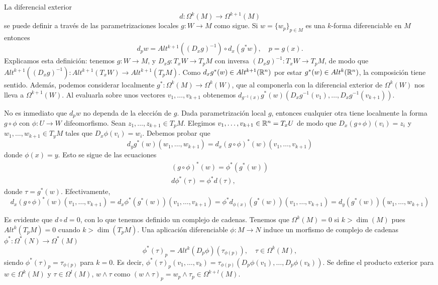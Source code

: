 \documentclass[CV.tex]{subfiles}
\begin{document}
La diferencial exterior
\[
d:\Omega^k(M)\to\Omega^{k+1}(M)
\]
se puede definir a través de las parametrizaciones locales $g:W\to M$ como sigue. Si $w=\{w_p\}_{p\in M}$ es una $k$-forma diferenciable en $M$ entonces
\[
d_pw=Alt^{k+1}((D_xg)^{-1})\circ d_x(g^*w),\quad p=g(x).
\]
Explicamos esta definición: tenemos $g:W\to M$, y $D_xg:T_xW\to T_pM$ con inversa $(D_xg)^{-1}:T_xW\to T_pM$, de modo que $Alt^{k+1}((D_xg)^{-1}):Alt^{k+1}(T_xW)\to Alt^{k+1}(T_pM)$. Como $d_xg^*(w)\in Alt^{k+1}(\mathbb{R}^n)$ por estar $g^*(w)\in Alt^{k}(\mathbb{R}^n)$, la composición tiene sentido. Además, podemos considerar localmente $g^*:\Omega^k(M)\to \Omega^k(W)$, que al componerla con la diferencial exterior de $\Omega^k(W)$ nos lleva a $\Omega^{k+1}(W)$. Al evaluarla sobre unos vectores $v_1,\dots, v_{k+1}$ obtenemos $d_{g^{-1}(x)}g^*(w)(D_xg^{-1}(v_1),\dots, D_xg^{-1}(v_{k+1}))$. 

No es inmediato que $d_pw$ no dependa de la elección de $g$. Dada parametrización local $g$, entonces cualquier otra tiene localmente la forma $g\circ\phi$ con $\phi:U\to W$ difeomorfismo. Sean $z_1,\dots, z_{k+1}\in T_pM$. Elegimos $v_1,\dots, v_{k+1}\in\mathbb{R}^n=T_xU$ de modo que $D_x(g\circ \phi)(v_i)=z_i$ y $w_1,\dots, w_{k+1}\in T_yM$ tales que $D_x\phi(v_i)=w_i$. Debemos probar que
\[
d_yg^*(w)(w_1,\dots, w_{k+1})=d_x(g\circ\phi)^*(w)(v_1,\dots,v_{k+1})
\]
donde $\phi(x)=y$. Esto se sigue de las ecuaciones 
\begin{gather*}
(g\circ\phi)^*(w)=\phi^*(g^*(w))\\
d\phi^*(\tau)=\phi^*d(\tau),
\end{gather*}
donde $\tau=g^*(w)$. %
Efectivamente,
\[
d_x(g\circ\phi)^*(w)(v_1,\dots,v_{k+1})=d_x\phi^*( g^*(w))(v_1,\dots,v_{k+1})=\phi^*d_{\phi(x)}(g^*(w))(v_1,\dots,v_{k+1})=d_y(g^*(w))(w_1,\dots, w_{k+1})
\] 

Es evidente que $d\circ d=0$, con lo que tenemos definido un complejo de cadenas. Tenemos que $\Omega^k(M)=0$ si $k>\dim(M)$ pues $Alt^k(T_pM)=0$ cuando $k>\dim(T_pM)$. Una aplicación diferenciable $\phi:M\to N$ induce un morfismo de complejo de cadenas $\phi^*:\Omega^*(N)\to\Omega^*(M)$
\[
\phi^*(\tau)_p=Alt^k(D_p\phi)(\tau_{\phi(p)}),\quad \tau\in \Omega^k(M),
\]
siendo $\phi^*(\tau)_p=\tau_{\phi(p)}$ para $k=0$. Es decir, $\phi^*(\tau)_p(v_1,\dots, v_k)=\tau_{\phi(p)}(D_p\phi(v_1),\dots, D_p\phi(v_k))$. Se define el producto exterior para $w\in\Omega^k(M)$ y $\tau\in\Omega^l(M)$, $w\land\tau$ como $(w\land\tau)_p=w_p\land\tau_p\in\Omega^{k+l}(M)$.
\end{document}
